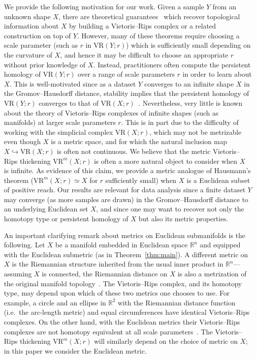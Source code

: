 \documentclass{amsart}
\theoremstyle{plain}
\theoremstyle{definition}
\theoremstyle{myremark}
\newcommand{\R}{\mathbb{R}}
\newcommand{\vr}[2]{\mathrm{VR}(#1;#2)}
\newcommand{\vrm}[2]{\mathrm{VR}^m(#1;#2)}
\begin{document}
We provide the following motivation for our work.
Given a sample $Y$ from an unknown shape $X$, there are theoretical guarantees~\cite{AFV,AttaliLieutier,ChazalDeSilvaOudot2013,ChazalOudot2008,Latschev,NiyogiSmaleWeinberger} which recover topological information about $X$ by building a Vietoris--Rips complex or a related construction on top of $Y$. 
However, many of these theorems require choosing a scale parameter (such as $r$ in $\vr{Y}{r}$) which is sufficiently small depending on the curvature of $X$, and hence it may be difficult to choose an appropriate $r$ without prior knowledge of $X$.
Instead, practitioners often compute the persistent homology of $\vr{Y}{r}$ over a range of scale parameters $r$ in order to learn about $X$.
This is well-motivated since as a dataset $Y$ converges to an infinite shape $X$ in the Gromov--Hausdorff distance, stability implies that the persistent homology of $\vr{Y}{r}$ converges to that of $\vr{X}{r}$~\cite{ChazalDeSilvaOudot2013}.
Nevertheless, very little is known about the theory of Vietoris--Rips complexes of infinite shapes (such as manifolds) at larger scale parameters $r$.
This is in part due to the difficulty of working with the simplicial complex $\vr{X}{r}$, which may not be metrizable even though $X$ is a metric space, and for which the natural inclusion map $X\hookrightarrow \vr{X}{r}$ is often not continuous.
We believe that the metric Vietoris--Rips thickening $\vrm{X}{r}$ is often a more natural object to consider when $X$ is infinite.
As evidence of this claim, we provide a metric analogue of Hausmann's theorem ($\vrm{X}{r}\simeq X$ for $r$ sufficiently small) when $X$ is a Euclidean subset of positive reach.
Our results are relevant for data analysis since a finite dataset $Y$ may converge (as more samples are drawn) in the Gromov--Hausdorff distance to an underlying Euclidean set $X$, and since one may want to recover not only the homotopy type or persistent homology of $X$ but also its metric properties.

An important clarifying remark about metrics on Euclidean submanifolds is the following.
Let $X$ be a manifold embedded in Euclidean space $\R^n$ and equipped with the Euclidean submetric (as in Theorem~\ref{thm:main}).
A different metric on $X$ is the Riemannian structure inherited from the usual inner product in $\R^n$---assuming $X$ is connected, the Riemannian distance on $X$ is also a metrization of the original manifold topology~\cite{Lee}. %
The Vietoris--Rips complex, and its homotopy type, may depend upon 
which of these two metrics one chooses to use.
For example, a circle and an ellipse in $\R^2$ with the Riemannian distance function (i.e.\ the arc-length metric) and equal circumferences have identical Vietoris--Rips complexes.
On the other hand, with the Euclidean metrics their Vietoris--Rips complexes are not homotopy equivalent at all scale parameters~\cite{AA-VRS1,AAR}.
The Vietoris--Rips thickening $\vrm{X}{r}$ will similarly depend on the choice of metric on $X$; in this paper we consider the Euclidean metric.
\end{document}
